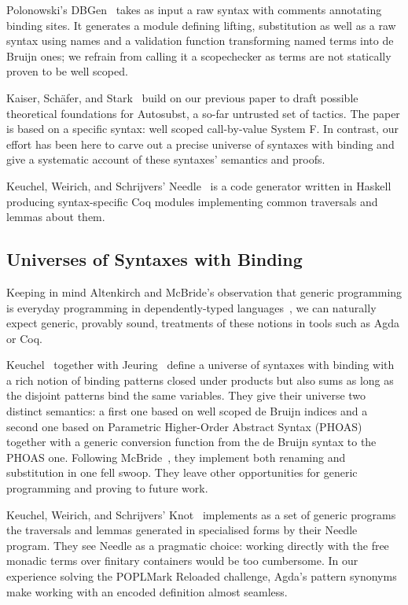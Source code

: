 {Polonowski's DBGen~\citeyear{polonowski:db} takes as input a raw syntax with
comments annotating binding sites. It generates a module defining lifting,
substitution as well as a raw syntax using names and a validation function
transforming named terms into de Bruijn ones; we refrain from calling it a
scopechecker as terms are not statically proven to be well scoped.

Kaiser, Schäfer, and Stark~\citeyear{Kaiser-wsdebr} build on our previous paper
to draft possible theoretical foundations for Autosubst, a so-far untrusted
set of tactics. The paper is based on a specific syntax: well scoped call-by-value
System F. In contrast, our effort has been here to carve out
a precise universe of syntaxes with binding and give a systematic account
of these syntaxes' semantics and proofs.

Keuchel, Weirich, and Schrijvers' Needle~\citeyear{needleandknot} is a code
generator written in Haskell producing syntax-specific Coq modules
implementing common traversals and lemmas about them.

\subsection{Universes of Syntaxes with Binding} Keeping in mind Altenkirch
and McBride's observation that generic programming is everyday programming
in dependently-typed languages~\citeyear{DBLP:conf/ifip2-1/AltenkirchM02}, we can naturally
expect generic, provably sound, treatments of these notions in tools such as
Agda or Coq.

Keuchel~\citeyear{Keuchel:Thesis:2011} together with Jeuring~\citeyear{DBLP:conf/icfp/KeuchelJ12}
define a universe of syntaxes with binding with a rich notion of binding patterns
closed under products but also sums as long as the disjoint patterns bind the same
variables. They give their universe two distinct semantics: a first one based on well
scoped de Bruijn indices and a second one based on Parametric Higher-Order Abstract
Syntax (PHOAS)~\cite{DBLP:conf/icfp/Chlipala08} together with a generic conversion
function from the de Bruijn syntax to the PHOAS one. Following McBride~\citeyear{mcbride2005type},
they implement both renaming and substitution in one fell swoop. They leave other
opportunities for generic programming and proving to future work.

Keuchel, Weirich, and Schrijvers' Knot~\citeyear{needleandknot} implements
as a set of generic programs the traversals and lemmas generated in specialised
forms by their Needle program. They see Needle as a pragmatic choice: working
directly with the free monadic terms over finitary containers would be too cumbersome. In
our experience solving the POPLMark Reloaded challenge, Agda's pattern
synonyms make working with an encoded definition almost
seamless.

}
